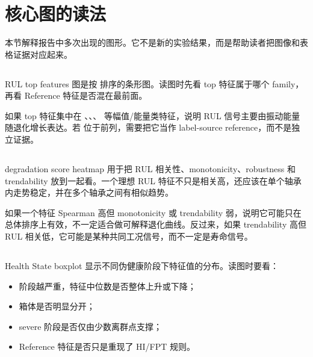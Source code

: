 \section{核心图的读法}

本节解释报告中多次出现的图形。它不是新的实验结果，而是帮助读者把图像和表格证据对应起来。

\subsection{}

RUL top features 图是按  排序的条形图。读图时先看 top 特征属于哪个 family，再看 Reference 特征是否混在最前面。

如果 top 特征集中在 、、、 等幅值/能量类特征，说明 RUL 信号主要由振动能量随退化增长表达。若  位于前列，需要把它当作 label-source reference，而不是独立证据。

\subsection{}

degradation score heatmap 用于把 RUL 相关性、monotonicity、robustness 和 trendability 放到一起看。一个理想 RUL 特征不只是相关高，还应该在单个轴承内走势稳定，并在多个轴承之间有相似趋势。

如果一个特征 Spearman 高但 monotonicity 或 trendability 弱，说明它可能只在总体排序上有效，不一定适合做可解释退化曲线。反过来，如果 trendability 高但 RUL 相关低，它可能是某种共同工况信号，而不一定是寿命信号。

\subsection{}

Health State boxplot 显示不同伪健康阶段下特征值的分布。读图时要看：

\begin{itemize}[leftmargin=2em]
  \item 阶段越严重，特征中位数是否整体上升或下降；
  \item 箱体是否明显分开；
  \item severe 阶段是否仅由少数离群点支撑；
  \item Reference 特征是否只是重现了 HI/FPT 规则。
\end{itemize}

